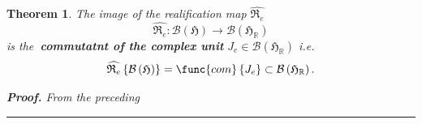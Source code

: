 \documentclass[aps,preprint]{revtex4}
\newtheorem{theorem}{Theorem}
\newenvironment{proof}[1][Proof]{\noindent\textbf{#1.} }{\ \rule{0.5em}{0.5em}}
\begin{document}
\begin{theorem}
The image of the realification map $\widehat{\mathfrak{R}_{e}}$ 
\begin{equation}
\widehat{\mathfrak{R}_{e}}:\mathcal{B}\left( \mathfrak{H}\right) \rightarrow 
\mathcal{B}\left( \mathfrak{H}_{\mathbb{R}}\right)
\end{equation}%
is the\textbf{\ commutatnt of the complex unit }$J_{e}\in \mathcal{B}\left( 
\mathfrak{H}_{\mathbb{R}}\right) $ i.e. 
\begin{equation}
\widehat{\mathfrak{R}_{e}}\left\{ \mathcal{B}\left( \mathfrak{H}\right)
\right\} =\func{com}\left\{ J_{e}\right\} \subset \mathcal{B}\left( 
\mathfrak{H}_{\mathbb{R}}\right) .
\end{equation}

\begin{proof}
From the preceding
\end{proof}
\end{theorem}
\end{document}
